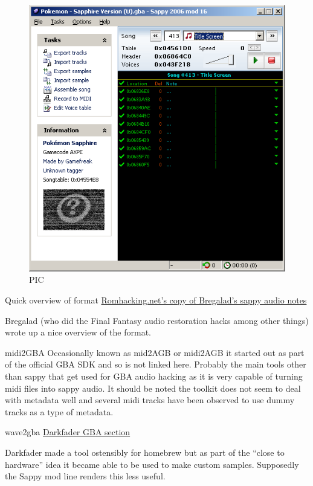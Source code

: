 \documentclass[
]{book}
\begin{document}
\begin{figure}
\centering
\includegraphics{images/165_home_fast6191_romhackingguide_unrenamed_fil___al_borders_romhackingguidesappy2006_mod16_1.png}
\caption{PIC}
\end{figure}

Quick overview of format \href{http://www.romhacking.net/documents/462/}{Romhacking.net's copy of Bregalad's sappy audio notes}

Bregalad (who did the Final Fantasy audio restoration hacks among other things) wrote up a nice overview of the format.

midi2GBA Occasionally known as mid2AGB or midi2AGB it started out as part of the official GBA SDK and so is not linked here. Probably the main tools other than sappy that get used for GBA audio hacking as it is very capable of turning midi files into sappy audio. It should be noted the toolkit does not seem to deal with metadata well and several midi tracks have been observed to use dummy tracks as a type of metadata.

wave2gba \href{http://www.darkfader.net/gba/}{Darkfader GBA section}

Darkfader made a tool ostensibly for homebrew but as part of the ``close to hardware'' idea it became able to be used to make custom samples. Supposedly the Sappy mod line renders this less useful.
\end{document}
